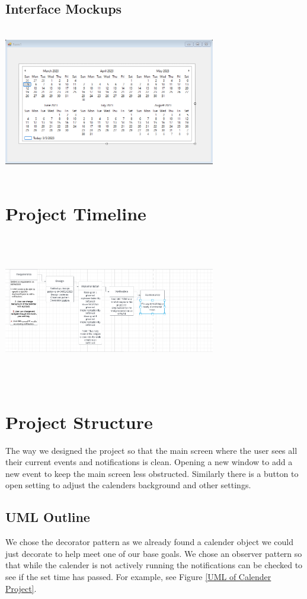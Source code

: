 \documentclass[10pt,conference,onecolumn,compsoc]{IEEEtran}
\begin{document}
\subsection{Interface Mockups}
\includegraphics[height=250px, width=350px]{gui.png}
\label{GUI Mockup}




\section{Project Timeline}
\includegraphics[height=250px, width=350px]{Roadmap.png}

\section{Project Structure}
The way we designed the project so that the main screen where the user sees all their current events and notifications is clean. Opening a new window to add a new event to keep the main screen less obstructed. Similarly there is a button to open setting to adjust the calenders background and other settings. 

\subsection{UML Outline}
We chose the decorator pattern as we already found a calender object we could just decorate to help meet one of our base goals. We chose an observer pattern so that while the calender is not actively running the notifications can be checked to see if the set time has passed.  
For example, see Figure \ref{UML of Calender Project}.
\end{document}
